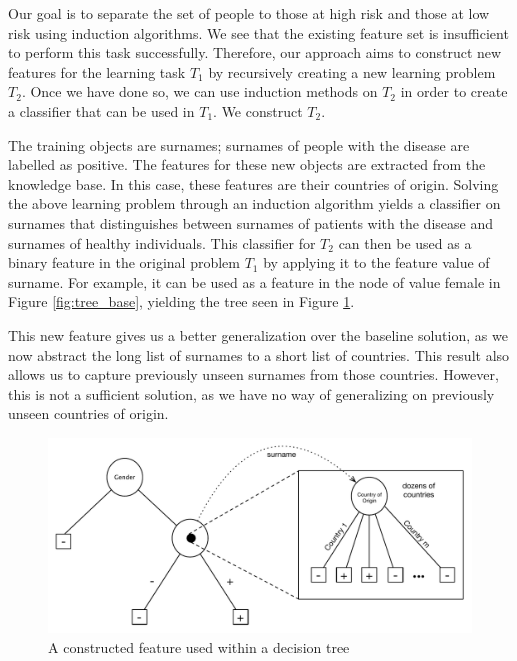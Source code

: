 \documentclass{article}
\theoremstyle{definition}
\begin{document}
Our goal is to separate the set of people to those at high risk and those at low risk using induction algorithms. We see that the existing feature set is insufficient to perform this task successfully. Therefore, our approach aims to construct new features for the learning task $T_1$ by recursively creating a new learning problem $T_2$. Once we have done so, we can use induction methods on $T_2$ in order to create a classifier that can be used in $T_1$. We construct $T_2$. %

The training objects are surnames; surnames of people with the disease are labelled as positive. The features for these new objects are extracted from the knowledge base. In this case, these features are their countries of origin.
Solving the above learning problem through an induction algorithm yields a classifier on surnames that distinguishes between surnames of patients with the disease and surnames of healthy individuals. This classifier for $T_2$ can then be used as a binary feature in the original problem $T_1$ by applying it to the feature value of surname. For example, it can be used as a feature in the node of value female in Figure \ref{fig:tree_base}, yielding the tree seen in Figure \ref{fig:lvl1_tree}. 

This new feature gives us a better generalization over the baseline solution, as we now abstract the long list of surnames to a short list of countries. %
This result also allows us to capture previously unseen surnames from those countries. However, this is not a sufficient solution, as we have no way of generalizing on previously unseen countries of origin. %


\begin{figure}[h]
	\centering
	\includegraphics[width=\linewidth]{fig2.pdf}
	\caption{A constructed feature used within a decision tree}
	\label{fig:lvl1_tree}
\end{figure}
\end{document}
